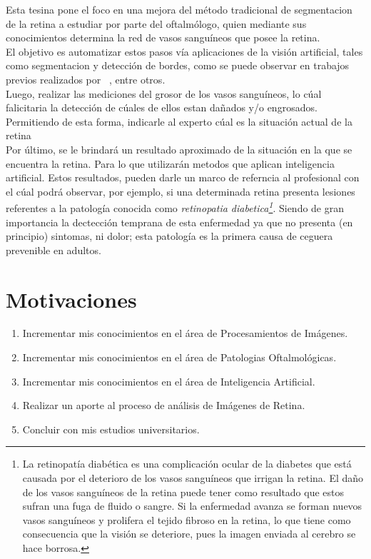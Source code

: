 \documentclass[14pt]{article}
\begin{document}
Esta tesina pone el foco en una mejora del método tradicional de segmentacion de la retina a estudiar por parte del oftalmólogo,
quien mediante sus conocimientos determina la red de vasos sanguíneos que posee la retina.\\[0.5cm]
El objetivo es automatizar estos pasos vía aplicaciones de la visión artificial, tales como segmentacion y 
detección de bordes,  como se puede observar en trabajos previos realizados por ~\cite{Gambini2006},  entre otros.\\[0.5cm]
Luego, realizar las mediciones del grosor de los vasos sanguíneos, lo cúal falicitaria la detección de cúales de ellos estan dañados y/o engrosados. Permitiendo de esta forma, indicarle al experto cúal es la situación actual de la retina\\[0.5cm]
Por último, se le brindará un resultado aproximado de la situación en la que se encuentra la retina. Para lo que utilizarán metodos que aplican inteligencia artificial.
Estos resultados, pueden darle un marco de referncia al profesional con el cúal podrá observar, por ejemplo, si una determinada retina presenta lesiones referentes a la patología conocida como \textit{retinopatia diabetica\footnote{La retinopatía diabética es una complicación ocular de la diabetes que está causada por el deterioro de los vasos sanguíneos que irrigan la retina. El daño de los vasos sanguíneos de la retina puede tener como resultado que estos sufran una fuga de fluido o sangre. Si la enfermedad avanza se forman nuevos vasos sanguíneos y prolifera el tejido fibroso en la retina, lo que tiene como consecuencia que la visión se deteriore, pues la imagen enviada al cerebro se hace borrosa.}}. Siendo de gran importancia la dectección temprana de esta enfermedad ya que no presenta (en principio) sintomas, ni dolor; esta patología es la primera causa de ceguera prevenible en adultos.





\section{Motivaciones}


\begin{enumerate}
	
	\item Incrementar mis conocimientos en el área de Procesamientos de Imágenes.
	\item Incrementar mis conocimientos en el área de Patologias Oftalmológicas.
	\item Incrementar mis conocimientos en el área de Inteligencia Artificial.
	\item Realizar un aporte al proceso de análisis de Imágenes de Retina.
	\item Concluir con mis estudios universitarios.
\end{enumerate}
\end{document}
